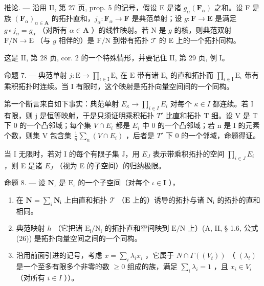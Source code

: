 推论. --- 沿用 II, 第 27 页, prop. 5 的记号，假设 E 是诸 \(g_{\alpha}(\mathbf{F}_{\alpha})\) 之和。设 F 是族 \((\mathbf{F}_{\alpha})_{\alpha \in \mathbf{A}}\) 的拓扑直和，\(j_{\alpha}: \mathbf{F}_{\alpha} \to \mathbf{F}\) 是典范单射；设 \(g: \mathbf{F} \to \mathbf{E}\) 是满足 \(g \circ j_{\alpha} = g_{\alpha}\) （对所有 \(\alpha \in \mathbf{A}\) ）的线性映射。若 N 是 \(g\) 的核，则典范双射 \(\mathrm{F/N} \to \mathrm{E}\) （与 \(g\) 相伴的）是 \(\mathrm{F/N}\) 到带有拓扑 \(\mathcal{T}\) 的 E 上的一个拓扑同构。

这是 II, 第 28 页, cor. 2 的一个特殊情形，并要记住 II, 第 29 页, 例 I。

命题 7. --- 典范单射 \(j: \mathrm{E} \to \prod_{\iota \in \mathrm{I}} \mathrm{E}_{\iota}\) 在 \(\mathrm{E}\) 带有诸 \(\mathrm{E}_{\iota}\) 的直和拓扑而 \(\prod_{\iota \in \mathrm{I}} \mathrm{E}_{\iota}\) 带有乘积拓扑时连续。当 \(\mathrm{I}\) 有限时，这个映射是拓扑向量空间间的一个同构。

第一个断言来自如下事实：典范单射 \(E_{\kappa} \to \prod_{i \in I} E_{i}\) 对每个 \(\kappa \in I\) 都连续。若 I 有限，则 j 是恒等映射，于是只须证明乘积拓扑 \(T'\) 比直和拓扑 T 细。设 V 是 T 下 0 的一个凸邻域；每个集 \(V \cap E_{i}\) 都是 \(E_{i}\) 中 0 的一个凸邻域；若 n 是 I 的元素个数，则集 V 包含集 \(\frac{1}{n} \sum_{n} (V \cap E_{i})\) ，后者是 \(T'\) 下 0 的一个邻域，命题得证。

当 I 无限时，若对 I 的每个有限子集 J，用 \(E_{J}\) 表示带乘积拓扑的空间 \(\prod_{i\in J}E_{i}\) ，则 E 是诸 \(E_{J}\) （视为 E 的子空间）的归纳极限。

命题 8. --- 设 \(\mathbf{N}_{\iota}\) 是 \(\mathrm{E}_{\iota}\) 的一个子空间（对每个 \(\iota \in \mathbf{I}\) ），

\begin{enumerate}
\def\labelenumi{(\roman{enumi})}
\item
  在 \(\mathbf{N} = \sum_{\mathfrak{i}}\mathbf{N}_{\mathfrak{i}}\) 上由直和拓扑 \(\mathcal{T}\) （\(\mathbf{E}\) 上的）诱导的拓扑与诸 \(\mathbf{N}_{\mathfrak{i}}\) 的拓扑的直和相同。
\item
  典范映射 \(h\) （它把诸 \(\mathrm{E}_{\mathrm{i}} / \mathrm{N}_{\mathrm{i}}\) 的拓扑直和空间映到 \(\mathrm{E} / \mathrm{N}\) 上）(A, II, § 1.6, 公式 (26)) 是拓扑向量空间之间的一个同构。
\item
  沿用前面引进的记号，考虑 \(x = \sum_{i} \lambda_i x_i\) ，它属于 \(N \cap \Gamma((V_{t}))\) （ \((\lambda_{t})\) 是一个至多有限多个非零的数 \(\geqslant 0\) 组成的族，满足 \(\sum_{i} \lambda_{i} = 1\) ，且 \(x_{i} \in V_{i}\) （对所有 \(i \in I\) ））。
\end{enumerate}

